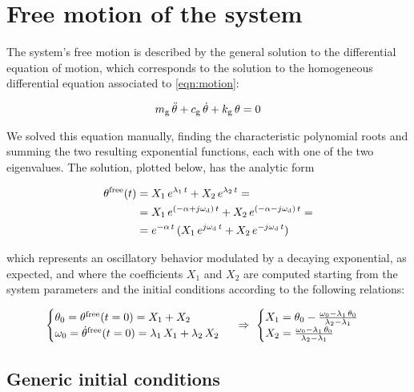 \documentclass[a4paper,12pt,oneside]{article}
\begin{document}
\section{Free motion of the system}

The system's free motion is described by the general solution to the differential equation of motion, which corresponds to the solution to the homogeneous differential equation associated to \eqref{eqn:motion}:

\[
	m_\textup{g} \, \ddot{\theta} + c_\textup{g} \, \dot{\theta} +
		k_\textup{g} \, \theta = 0
\]

We solved this equation manually, finding the characteristic polynomial roots and summing the two resulting exponential functions, each with one of the two eigenvalues. The solution, plotted below, has the analytic form

\[ \begin{split}
	\theta^\textup{free}(t)	&
		= X_1 \, e^{\lambda_1 \, t} + X_2 \, e^{\lambda_2 \, t} = \\
													& = X_1 \, e^{(-\alpha + j \omega_\textup{d}) \, t} +
														X_2 \, e^{(-\alpha - j \omega_\textup{d}) \, t} = \\
													& = e^{-\alpha \, t} \,
														(X_1 \, e^{j \omega_\textup{d} \, t} +
														X_2 \, e^{- j \omega_\textup{d} \, t})
\end{split} \]

which represents an oscillatory behavior modulated by a decaying exponential, as expected, and where the coefficients $ X_1 $ and $ X_2 $ are computed starting from the system parameters and the initial conditions according to the following relations:

\[
	\begin{cases}
		\theta_0 = \theta^\textup{free}(t = 0) = X_1 + X_2 \\
		\omega_0 = \dot{\theta}^\textup{free}(t = 0) = \lambda_1 \, X_1 + \lambda_2 \, X_2
	\end{cases} ~ \Rightarrow ~
	\begin{cases}
		X_1 = \theta_0 - \frac{\omega_0 - \lambda_1 \, \theta_0}
			{\lambda_2 - \lambda_1} \\
		X_2 = \frac{\omega_0 - \lambda_1 \, \theta_0}
			{\lambda_2 - \lambda_1}
	\end{cases}
\]

\subsection{Generic initial conditions}
\label{subs:generic_initial_conditions}
\end{document}
